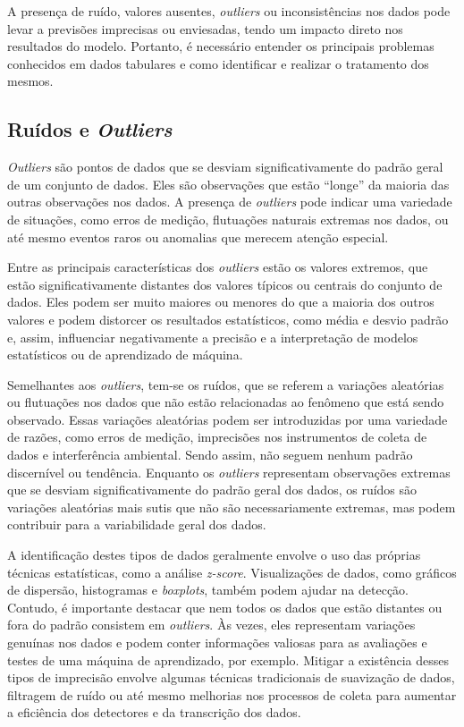 A presença de ruído, valores ausentes, \textit{outliers} ou inconsistências nos dados pode levar a previsões imprecisas ou enviesadas, tendo um impacto direto nos resultados do modelo. Portanto, é necessário entender os principais problemas conhecidos em dados tabulares e como identificar e realizar o tratamento dos mesmos.

\subsection{Ruídos e \textit{Outliers}}

\textit{Outliers} são pontos de dados que se desviam significativamente do padrão geral de um conjunto de dados. Eles são observações que estão ``longe'' da maioria das outras observações nos dados. A presença de \textit{outliers} pode indicar uma variedade de situações, como erros de medição, flutuações naturais extremas nos dados, ou até mesmo eventos raros ou anomalias que merecem atenção especial.

Entre as principais características dos \textit{outliers} estão os valores extremos, que estão significativamente distantes dos valores típicos ou centrais do conjunto de dados. Eles podem ser muito maiores ou menores do que a maioria dos outros valores e podem distorcer os resultados estatísticos, como média e desvio padrão e, assim, influenciar negativamente a precisão e a interpretação de modelos estatísticos ou de aprendizado de máquina.

Semelhantes aos \textit{outliers}, tem-se os ruídos, que se referem a variações aleatórias ou flutuações nos dados que não estão relacionadas ao fenômeno que está sendo observado. Essas variações aleatórias podem ser introduzidas por uma variedade de razões, como erros de medição, imprecisões nos instrumentos de coleta de dados e interferência ambiental. Sendo assim, não seguem nenhum padrão discernível ou tendência. Enquanto os \textit{outliers} representam observações extremas que se desviam significativamente do padrão geral dos dados, os ruídos são variações aleatórias mais sutis que não são necessariamente extremas, mas podem contribuir para a variabilidade geral dos dados.

A identificação destes tipos de dados geralmente envolve o uso das próprias técnicas estatísticas, como a análise \textit{z-score}. Visualizações de dados, como gráficos de dispersão, histogramas e \textit{boxplots}, também podem ajudar na detecção. Contudo, é importante destacar que nem todos os dados que estão distantes ou fora do padrão consistem em \textit{outliers}. Às vezes, eles representam variações genuínas nos dados e podem conter informações valiosas para as avaliações e testes de uma máquina de aprendizado, por exemplo. Mitigar a existência desses tipos de imprecisão envolve algumas técnicas tradicionais de suavização de dados, filtragem de ruído ou até mesmo melhorias nos processos de coleta para aumentar a eficiência dos detectores e da transcrição dos dados.

